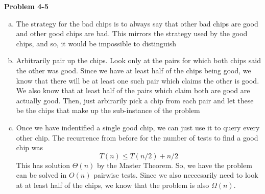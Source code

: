 \documentclass{article}
\begin{document}
\noindent\textbf{Problem 4-5}\\
\begin{enumerate}[a)]

\item
The strategy for the bad chips is to always say that other bad chips are good and other good chips are bad. This mirrors the strategy used by the good chips, and so, it would be impossible to distinguish

\item
Arbitrarily pair up the chips. Look only at the pairs for which both chips said the other was good. Since we have at least half of the chips being good, we know that there will be at least one such pair which claims the other is good. We also know that at least half of the pairs which claim both are good are actually good. Then, just arbirarily pick a chip from each pair and let these be the chips that make up the sub-instance of the problem

\item
Once we have indentified a single good chip, we can just use it to query every other chip. 
The recurrence from before for the number of tests to find a good chip was
\[
T(n) \le T(n/2) + n/2
\]
This has solution $\Theta(n)$ by the Master Theorem. So, we have the problem can be solved in $O(n)$ pairwise tests. Since we also neccesarily need to look at at least half of the chips, we know that the problem is also $\Omega(n)$.

\end{enumerate}
\end{document}
